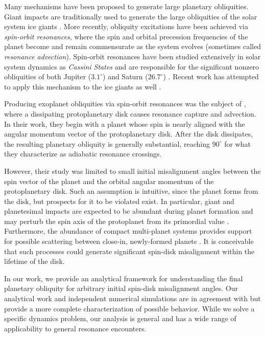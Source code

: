 \documentclass[
        fleqn,
        usenatbib,
    ]{mnras}
\begin{document}
Many mechanisms have been proposed to generate large planetary obliquities.
Giant impacts are traditionally used to generate the large obliquities of the
solar system ice giants \citep{original_gi, morbidelli_gi}. More recently,
obliquity excitations have been achieved via \emph{spin-orbit resonances}, where
the spin and orbital precession frequencies of the planet become and remain
commensurate as the system evolves (sometimes called \emph{resonance
advection}). Spin-orbit resonances have been studied extensively in solar system
dynamics as \emph{Cassini States} and are responsible for the significant
nonzero obliquities of both Jupiter ($3.1^\circ$) and Saturn ($26.7^\circ$)
\citep{colombo1966, henrard1987, ward2004I, ward_jupiter}. Recent work has
attempted to apply this mechanism to the ice giants as well
\citep{hamilton_tilting_ice}.

Producing exoplanet obliquities via spin-orbit resonances was the subject of
\citet{millholland_disk}, where a dissipating protoplanetary disk causes
resonance capture and advection. In their work, they begin with a planet whose
spin is nearly aligned with the angular momentum vector of the protoplanetary
disk. After the disk dissipates, the resulting planetary obliquity is generally
substantial, reaching $90^\circ$ for what they characterize as adiabatic
resonance crossings.

However, their study was limited to small initial misalignment angles between
the spin vector of the planet and the orbital angular momentum of the
protoplanetary disk. Such an assumption is intuitive, since the planet forms
from the disk, but prospects for it to be violated exist. In particular, giant
and planetesimal impacts are expected to be abundant during planet formation and
may perturb the spin axis of the protoplanet from its primordial value
\citep{yalinewich2019atmospheric, schlichting2015atmospheric}. Furthermore, the
abundance of compact multi-planet systems provides support for possible
scattering between close-in, newly-formed planets \citep{usp_compact1,
usp_review}. It is conceivable that such processes could generate significant
spin-disk misalignment within the lifetime of the disk.

In our work, we provide an analytical framework for understanding the final
planetary obliquity for arbitrary initial spin-disk misalignment angles. Our
analytical work and independent numerical simulations are in agreement with
\citet{millholland_disk} but provide a more complete characterization of
possible behavior. While we solve a specific dynamics problem, our analysis
is general and has a wide range of applicability to general resonance
encounters.
\end{document}
